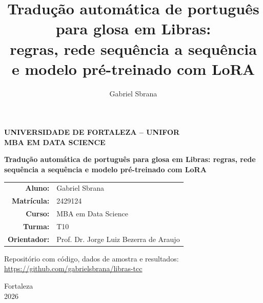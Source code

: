 \documentclass[12pt]{article}
\title{Tradução automática de português para glosa em Libras:\\
regras, rede sequência a sequência e modelo pré-treinado com LoRA}
\author{Gabriel Sbrana\inst{1}}
\begin{document}
\begin{titlepage}
\centering
{\large\bfseries UNIVERSIDADE DE FORTALEZA -- UNIFOR\\[2pt] MBA EM DATA SCIENCE\par}
\vspace{4.5cm}
{\XVIPT\bfseries Tradução automática de português para glosa em Libras: regras, rede sequência a sequência e modelo pré-treinado com LoRA\par}
\vspace{3.5cm}
\begin{tabular}{@{}r@{\quad}l@{}}
\textbf{Aluno:} & Gabriel Sbrana\\
\textbf{Matrícula:} & 2429124\\
\textbf{Curso:} & MBA em Data Science\\
\textbf{Turma:} & T10\\
\textbf{Orientador:} & Prof. Dr. Jorge Luiz Bezerra de Araujo\\
\end{tabular}
\vfill
{\normalsize Repositório com código, dados de amostra e resultados:\\
\url{https://github.com/gabrielsbrana/libras-tcc}\par}
\vspace{1.2cm}
{\large Fortaleza\\2026\par}
\end{titlepage}

\maketitle
\end{document}
